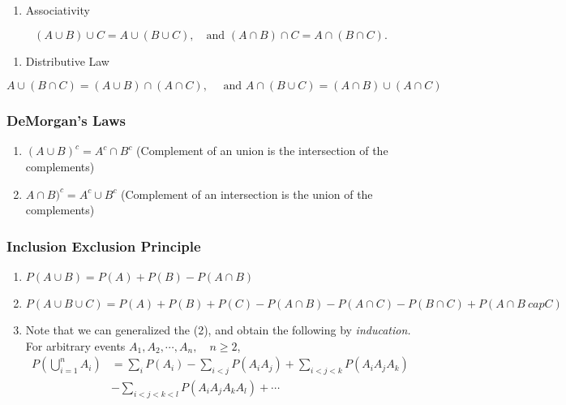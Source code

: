 \documentclass[
]{book}
\providecommand{\tightlist}{%
  \setlength{\itemsep}{0pt}\setlength{\parskip}{0pt}}
\theoremstyle{definition}
\theoremstyle{definition}
\theoremstyle{definition}
\theoremstyle{definition}
\theoremstyle{remark}
\begin{document}
\begin{enumerate}
\def\labelenumi{\arabic{enumi}.}
\setcounter{enumi}{1}
\tightlist
\item
  Associativity
\end{enumerate}

\[
  (A\cup B)\cup C = A \cup (B\cup C), \quad \text{and } (A\cap B)\cap C =  A \cap (B \cap C).
\]

\begin{enumerate}
\def\labelenumi{\arabic{enumi}.}
\setcounter{enumi}{2}
\tightlist
\item
  Distributive Law
\end{enumerate}

\[
  A\cup (B\cap C) = (A \cup B) \cap (A \cap  C) , \quad \text{ and } A \cap (B\cup C) =  (A\cap B) \cup (A\cap C)
\]

\subsubsection{DeMorgan's Laws}\label{demorgans-laws}

\begin{enumerate}
\def\labelenumi{\arabic{enumi}.}
\item
  \((A\cup B)^c = A^c \cap B^c\) (Complement of an union is the intersection of the complements)
\item
  \(A\cap B)^c = A^c \cup B^c\) (Complement of an intersection is the union of the complements)
\end{enumerate}

\subsubsection{Inclusion Exclusion Principle}\label{inclusion-exclusion-principle}

\begin{enumerate}
\def\labelenumi{\arabic{enumi}.}
\item
  \(P(A\cup B ) = P(A) + P(B) - P(A\cap B)\)
\item
  \(P(A\cup B \cup C)  = P(A) + P(B) + P(C) - P(A\cap B) - P(A \cap C) - P(B \cap C) + P(A\cap B \ cap C)\)
\item
  Note that we can generalized the (2), and obtain the following by \emph{inducation.} For arbitrary events \(A_1,A_2,\cdots,A_n,\quad n\ge 2\),
  \begin{align*}
  P(\bigcup_{i=1}^n A_i)  &  =\sum_{i}P(A_{i}%
  )-\sum_{i<j}P(A_{i}A_{j})+\sum_{i<j<k}P(A_{i}A_{j}A_{k})\\
  &  -\sum_{i<j<k<l}P(A_{i}A_{j}A_{k}A_{l})+\cdots
  \end{align*}
\end{enumerate}
\end{document}
